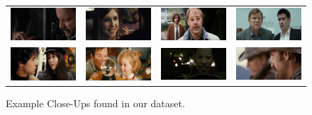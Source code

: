 \begin{figure}
\begin{center}
\begin{tabular}{cccc}
\includegraphics[width=0.2\linewidth]
  {fig/close-ups/09.jpg} 
& \includegraphics[width=0.2\linewidth]
  {fig/close-ups/04.jpg}  
& \includegraphics[width=0.2\linewidth]
  {fig/close-ups/11.jpg}   
& \includegraphics[width=0.2\linewidth]
  {fig/close-ups/12.jpg}
\\
\includegraphics[width=0.2\linewidth]
  {fig/close-ups/13.jpg} 
& \includegraphics[width=0.2\linewidth]
  {fig/close-ups/14.jpg}  
& \includegraphics[width=0.2\linewidth]
  {fig/close-ups/03.jpg}   
& \includegraphics[width=0.2\linewidth]
  {fig/close-ups/16.jpg}
\\
\end{tabular}
\end{center}
   \caption{Example Close-Ups found in our dataset.}
\label{fig:closeUps}
\end{figure}



